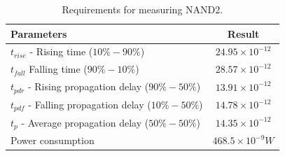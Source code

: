 \begin{table}[H]
	\centering
	\begin{tabular}{|p{.5\linewidth}|c|}
		\hline
		Parameters & Result\\
		\hline
		$t_{rise}$ - Rising time ($10\% - 90\%$) & $24.95\times10^{-12}$\\
		\hline
		$t_{fall}$  Falling time ($90\% - 10\%$) & $28.57\times10^{-12}$\\
		\hline
		$t_{pdr}$ - Rising propagation delay ($90\% - 50\%$) & $13.91\times10^{-12}$\\
		\hline
		$t_{pdf}$ - Falling propagation delay ($10\% - 50\%$) & $14.78\times10^{-12}$\\
		\hline
		$t_{p}$ - Average propagation delay ($50\% - 50\%$) & $14.35\times10^{-12}$\\
		\hline
		Power consumption & $468.5\times10^{-9} W$\\
		\hline
	\end{tabular}
	\caption{Requirements for measuring NAND2.}
	\label{f_measuring NAND2}
\end{table}

